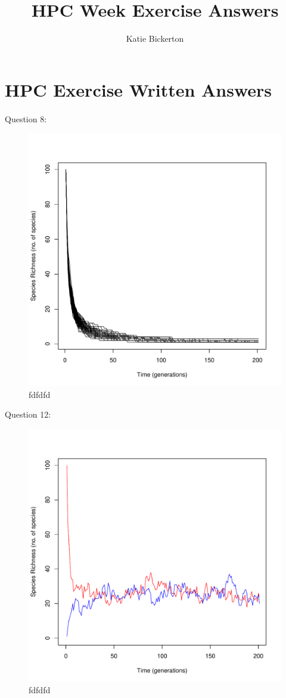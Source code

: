 \documentclass{article}
\title{HPC Week Exercise Answers}
\author{Katie Bickerton}
\begin{document}
\section*{HPC Exercise Written Answers}


	\paragraph{}
	
	Question 8:
	

	\begin{figure}[h]
			\includegraphics[width=\linewidth]{../Results/time_series.pdf}
		\caption{fdfdfd}
		\label{fig:q8}
	\end{figure} 
	
	Question 12:
	
		\begin{figure}[h]
		\includegraphics[width=\linewidth]{../Results/time_series_speciation.pdf}
		\caption{fdfdfd}
		\label{fig:q12}
	\end{figure} 
	
\end{document}

